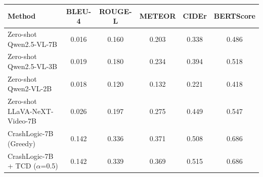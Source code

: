\begin{tabular}{lccccc}
\toprule
Method & BLEU-4 & ROUGE-L & METEOR & CIDEr & BERTScore \\
\midrule
Zero-shot Qwen2.5-VL-7B & 0.016 & 0.160 & 0.203 & 0.338 & 0.486 \\
Zero-shot Qwen2.5-VL-3B & 0.019 & 0.180 & 0.234 & 0.394 & 0.518 \\
Zero-shot Qwen2-VL-2B & 0.018 & 0.120 & 0.132 & 0.221 & 0.418 \\
Zero-shot LLaVA-NeXT-Video-7B & 0.026 & 0.197 & 0.275 & 0.449 & 0.547 \\
CrashLogic-7B (Greedy) & 0.142 & 0.336 & 0.371 & 0.508 & 0.686 \\
CrashLogic-7B + TCD ($\alpha$=0.5) & 0.142 & 0.339 & 0.369 & 0.515 & 0.686 \\
\bottomrule
\end{tabular}
